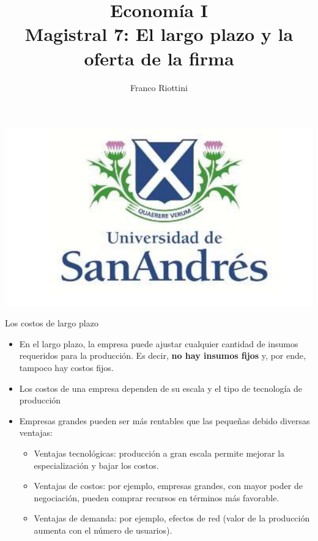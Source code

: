 \documentclass{beamer}
\title[Economía I]{Economía I \vspace{4mm}
\\ Magistral 7: El largo plazo y la oferta de la firma}
\date{}
\author[Riottini]{Franco Riottini}
\institute[]{Universidad de San Andrés}
\begin{document}
\begin{frame}
\titlepage
\centering
\includegraphics[scale=0.2]{../Figures/logoUDESA.jpg} 
\end{frame}

\begin{frame}{Los costos de largo plazo}
\begin{itemize}
    \item En el largo plazo, la empresa puede ajustar cualquier cantidad de insumos requeridos para la producción. Es decir, \textbf{no hay insumos fijos} y, por ende, tampoco hay costos fijos. 
    \item Los costos de una empresa dependen de su escala y el tipo de tecnología de producción
    \item Empresas grandes pueden ser más rentables que las pequeñas debido diversas ventajas:
    \begin{itemize}
        \item Ventajas tecnológicas: producción a gran escala permite mejorar la especialización y bajar los costos.
        \item Ventajas de costos: por ejemplo, empresas grandes, con mayor poder de negociación, pueden comprar recursos en términos más favorable.
        \item Ventajas de demanda: por ejemplo, efectos de red (valor de la producción aumenta con el número de usuarios).
    \end{itemize}
\end{itemize}
\end{frame}
\end{document}
